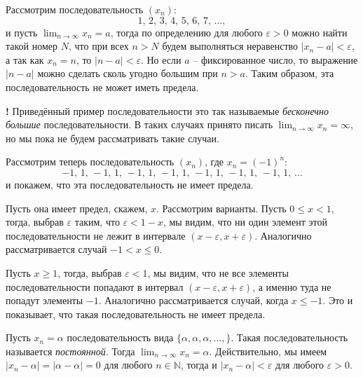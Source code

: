 \begin{example}
Рассмотрим последовательность $(x_n):$
\[
 1,\,2,\,3,\, 4,\, 5,\, 6,\, 7,\, \ldots,
\]
и пусть $\lim_{n \to \infty}x_n = a$, тогда по определению для любого $\varepsilon>0$ можно найти такой номер $N$, что при всех $n>N$ будем выполняться неравенство $|x_n - a|<\varepsilon$, а так как $x_n = n$, то $|n-a|<\varepsilon$. Но если $a$ -- фиксированное число, то выражение $|n-a|$ можно сделать сколь угодно большим при $n>a$. Таким образом, эта последовательность не может иметь предела.
\end{example}

\begin{mydanger}{\bf !}
 Приведённый пример последовательности это так называемые \textit{бесконечно большие} последовательности. В таких случаях принято писать $\lim_{n\to \infty}x_n = \infty$, но мы пока не будем рассматривать такие случаи.
\end{mydanger}

\begin{example}\label{(-1)^n}
Рассмотрим теперь последовательность $(x_n)$, где $x_n = (-1)^n:$
\[
 -1,\, 1,\,-1,\, 1,\,-1,\, 1,\,-1,\, 1,\,-1,\, 1,\,-1,\, 1,\,-1,\, 1,\, \ldots
\]
и покажем, что эта последовательность не имеет предела.

Пусть она имеет предел, скажем, $x$. Рассмотрим варианты. Пусть $0 \le x <1$, тогда, выбрав $\varepsilon$ таким, что $\varepsilon < 1-x$, мы видим, что ни один элемент этой последовательности не лежит в интервале $(x- \varepsilon, x+\varepsilon)$. Аналогично рассматривается случай $-1<x\le 0$.

Пусть $x\ge 1$, тогда, выбрав $\varepsilon < 1$, мы видим, что не все элементы последовательности попадают в интервал $(x-\varepsilon, x+ \varepsilon)$, а именно туда не попадут элементы $-1$. Аналогично рассматривается случай, когда $x\le -1$. Это и показывает, что такая последовательность не имеет предела.
\end{example}

\begin{example}
    Пусть $x_n =\alpha$ последовательность вида $\{\alpha, \alpha, \alpha, \ldots,\}.$ Такая последовательность называется \textit{постоянной.} Тогда $\lim_{n\to \infty }x_n = \alpha$. Действительно, мы имеем $|x_n - \alpha| = |\alpha - \alpha| = 0$ для любого $n \in \mathbb{N}$, тогда и $|x_n - \alpha| < \varepsilon$ для любого $\varepsilon>0.$
\end{example}


